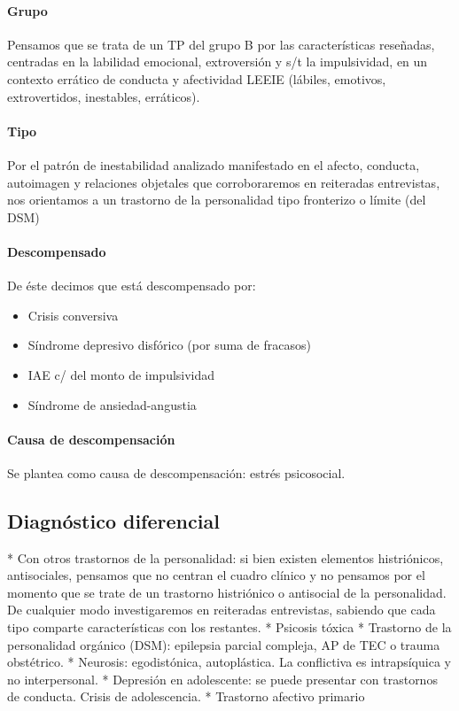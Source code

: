 \paragraph{Grupo}
Pensamos que se trata de un TP del grupo B por las características reseñadas, centradas en la labilidad emocional, extroversión y s/t la impulsividad, en un contexto errático de conducta y afectividad LEEIE (lábiles, emotivos, extrovertidos, inestables, erráticos).
\paragraph{Tipo}
Por el patrón de inestabilidad analizado manifestado en el afecto, conducta, autoimagen y relaciones objetales que corroboraremos en reiteradas entrevistas, nos orientamos a un trastorno de la personalidad tipo fronterizo o límite (del DSM)
\paragraph{Descompensado}
De éste decimos que está descompensado por:
\begin{itemize}
    \item Crisis conversiva
    \item Síndrome depresivo disfórico (por suma de fracasos)
    \item IAE c/ del monto de impulsividad
    \item Síndrome de ansiedad-angustia
\end{itemize}
\paragraph{Causa de descompensación}
Se plantea como causa de descompensación: estrés psicosocial.
\subsection*{Diagnóstico diferencial}

* Con otros trastornos de la personalidad: si bien existen elementos histriónicos, antisociales, pensamos que no centran el cuadro clínico y no pensamos por el momento que se trate de un trastorno histriónico o antisocial de la personalidad. De cualquier modo investigaremos en reiteradas entrevistas, sabiendo que cada tipo comparte características con los restantes.
* Psicosis tóxica
* Trastorno de la personalidad orgánico (DSM): epilepsia parcial compleja, AP de TEC o trauma obstétrico.
* Neurosis: egodistónica, autoplástica. La conflictiva es intrapsíquica y no interpersonal.
* Depresión en adolescente: se puede presentar con trastornos de conducta. Crisis de adolescencia.
* Trastorno afectivo primario

